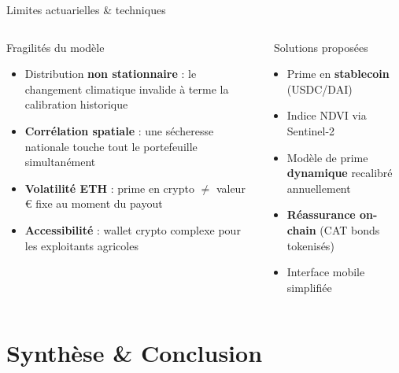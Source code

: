 \documentclass[aspectratio=169, 10pt, t]{beamer}
\newcommand{\euro}{€}
\begin{document}
\begin{frame}{Limites actuarielles \& techniques}
  \begin{columns}[c]
      \begin{alertblock}{Fragilités du modèle}
        \begin{itemize}
          \setlength{\itemsep}{6pt}
          \item[\textcolor{AlertRed}{\faTemperatureHigh}] Distribution \textbf{non stationnaire} :
            le changement climatique invalide à terme la calibration historique
          \item[\textcolor{AlertRed}{\faProjectDiagram}] \textbf{Corrélation spatiale} :
            une sécheresse nationale touche tout le portefeuille simultanément
          \item[\textcolor{AlertRed}{\faExchangeAlt}] \textbf{Volatilité ETH} :
            prime en crypto $\neq$ valeur \euro{} fixe au moment du payout
          \item[\textcolor{AlertRed}{\faWallet}] \textbf{Accessibilité} :
            wallet crypto complexe pour les exploitants agricoles
        \end{itemize}
      \end{alertblock}
      \begin{exampleblock}{\small\faLightbulb\ Solutions proposées}
        \small
        \begin{itemize}
          \setlength{\itemsep}{4pt}
          \item Prime en \textbf{stablecoin} (USDC/DAI)
          \item Indice NDVI via Sentinel-2
          \item Modèle de prime \textbf{dynamique} recalibré annuellement
          \item \textbf{Réassurance on-chain} (CAT bonds tokenisés)
          \item Interface mobile simplifiée
        \end{itemize}
      \end{exampleblock}
  \end{columns}
\end{frame}

\section{Synthèse \& Conclusion}
\end{document}
